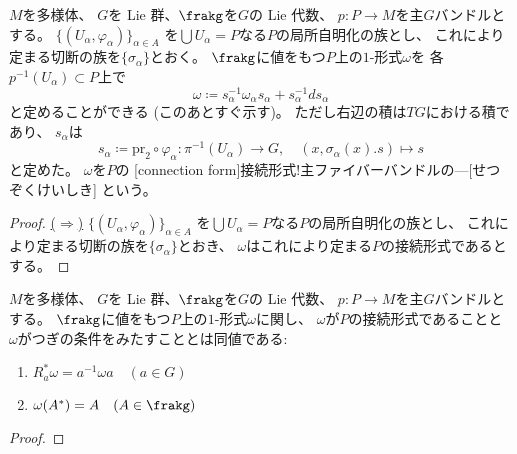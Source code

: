 \documentclass[report]{jlreq}
\begin{document}
\begin{definition}[主ファイバーバンドルの接続形式]
    $M$を多様体、
    $G$を Lie 群、$\frakg$を$G$の Lie 代数、
    $p \colon P \to M$を主$G$バンドルとする。
    $\{ (U_\alpha, \varphi_\alpha) \}_{\alpha \in A}$
    を$\bigcup U_\alpha = P$なる$P$の局所自明化の族とし、
    これにより定まる切断の族を$\{ \sigma_\alpha \}$とおく。
    $\frakg$に値をもつ$P$上の$1$-形式$\omega$を
    各$p^{-1}(U_\alpha) \subset P$上で
    \begin{equation}
        \omega \coloneqq
            s_\alpha^{-1} \omega_\alpha s_\alpha
            + s_{\alpha}^{-1} ds_\alpha
    \end{equation}
    と定めることができる (このあとすぐ示す)。
    ただし右辺の積は$TG$における積であり、
    $s_\alpha$は
    \begin{equation}
        s_\alpha \coloneqq \mathrm{pr}_2 \circ \varphi_\alpha
        \colon \pi^{-1}(U_\alpha) \to G,
        \quad
        (x, \sigma_\alpha(x) . s) \mapsto s
    \end{equation}
    と定めた。
    $\omega$を$P$の
    [connection form]{接続形式!主ファイバーバンドルの---}[せつぞくけいしき]
    という。
\end{definition}

\begin{proof}
    \uline{($\Rightarrow$)} \quad
    $\{ (U_\alpha, \varphi_\alpha) \}_{\alpha \in A}$
    を$\bigcup U_\alpha = P$なる$P$の局所自明化の族とし、
    これにより定まる切断の族を$\{ \sigma_\alpha \}$とおき、
    $\omega$はこれにより定まる$P$の接続形式であるとする。
\end{proof}

\begin{theorem}[主ファイバーバンドルの接続形式の特徴付け]
    $M$を多様体、
    $G$を Lie 群、$\frakg$を$G$の Lie 代数、
    $p \colon P \to M$を主$G$バンドルとする。
    $\frakg$に値をもつ$P$上の$1$-形式$\omega$に関し、
    $\omega$が$P$の接続形式であることと
    $\omega$がつぎの条件をみたすこととは同値である:
    \begin{enumerate}
        \item $R_a^* \omega = a^{-1} \omega a \quad (a \in G)$
        \item $\omega(A^*) = A \quad (A \in \frakg)$
    \end{enumerate}
\end{theorem}

\begin{proof}
    \TODO{}
\end{proof}
\end{document}
